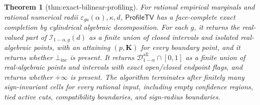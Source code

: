 \documentclass{article}
\newtheorem{theorem}{Theorem}
\begin{document}
\begin{theorem}[thm:exact-bilinear-profiling]\label{thm:exact-bilinear-profiling}
For rational empirical marginals and rational numerical radii \(\varepsilon_{ga}(\alpha),\kappa,d\), \(\mathsf{ProfileTV}\) has a face-complete exact completion by cylindrical algebraic decomposition.  For each \(g\), it returns the real-valued part of \(\mathcal I_{1-\alpha,g}(d)\) as a finite union of closed intervals and isolated real-algebraic points, with an attaining \((p,\mathbf K)\) for every boundary point, and it returns whether \(\bot_{\mathrm{inc}}\) is present.  It returns \(\mathcal D_{1-\alpha}^{\mathrm{all}}\cap[0,1]\) as a finite union of real-algebraic points and intervals with exact open/closed endpoint flags, and returns whether \(+\infty\) is present.  The algorithm terminates after finitely many sign-invariant cells for every rational input, including empty confidence regions, tied active cuts, compatibility boundaries, and sign-radius boundaries.
\end{theorem}
\end{document}
